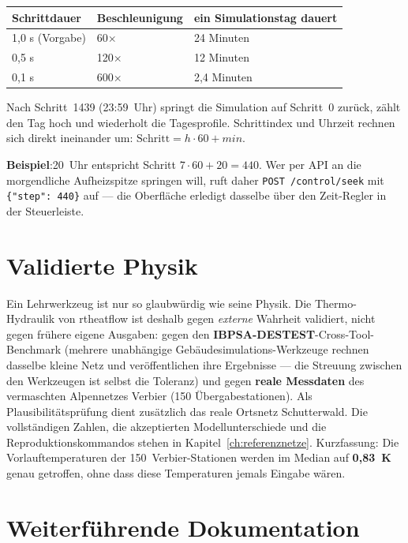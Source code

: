 \documentclass[11pt,a4paper,parskip=half]{scrreprt}
\newcommand{\api}[1]{\texttt{#1}}
\newenvironment{beispiel}[1][Beispiel]
  {\par\medskip{\color{bsp}\hrule height 0.8pt}\nopagebreak\smallskip
   \noindent\textbf{\textsf{\textcolor{bsp}{#1}}}\quad\ignorespaces}
  {\par\nopagebreak\smallskip{\color{bsp}\hrule height 0.8pt}\par\medskip}
\begin{document}
\begin{center}
\begin{tabular}{@{}lll@{}}
\toprule
Schrittdauer & Beschleunigung & ein Simulationstag dauert \\
\midrule
1{,}0 s (Vorgabe) & 60$\times$ & 24 Minuten \\
0{,}5 s & 120$\times$ & 12 Minuten \\
0{,}1 s & 600$\times$ & 2{,}4 Minuten \\
\bottomrule
\end{tabular}
\end{center}

Nach Schritt~1439 (23:59~Uhr) springt die Simulation auf Schritt~0 zurück,
zählt den Tag hoch und wiederholt die Tagesprofile. Schrittindex und Uhrzeit
rechnen sich direkt ineinander um: $\text{Schritt} = h \cdot 60 + \mathit{min}$.

\begin{beispiel}
07:20~Uhr entspricht Schritt $7 \cdot 60 + 20 = 440$. Wer per API an die
morgendliche Aufheizspitze springen will, ruft daher
\api{POST /control/seek} mit \texttt{\{"step": 440\}} auf --- die Oberfläche
erledigt dasselbe über den Zeit-Regler in der Steuerleiste.
\end{beispiel}

\section{Validierte Physik}
\label{sec:validierung}

Ein Lehrwerkzeug ist nur so glaubwürdig wie seine Physik. Die Thermo-Hydraulik
von rtheatflow ist deshalb gegen \emph{externe} Wahrheit validiert, nicht gegen
frühere eigene Ausgaben: gegen den \textbf{IBPSA-DESTEST}-Cross-Tool-Benchmark
(mehrere unabhängige Gebäudesimulations-Werkzeuge rechnen dasselbe kleine Netz
und veröffentlichen ihre Ergebnisse --- die Streuung zwischen den Werkzeugen ist
selbst die Toleranz) und gegen \textbf{reale Messdaten} des vermaschten
Alpennetzes Verbier (150 Übergabestationen). Als Plausibilitätsprüfung dient
zusätzlich das reale Ortsnetz Schutterwald. Die vollständigen Zahlen, die
akzeptierten Modellunterschiede und die Reproduktionskommandos stehen in
Kapitel~\ref{ch:referenznetze}. Kurzfassung: Die Vorlauftemperaturen der
150~Verbier-Stationen werden im Median auf \textbf{0{,}83~K} genau getroffen,
ohne dass diese Temperaturen jemals Eingabe wären.

\section{Weiterführende Dokumentation}
\label{sec:weiterdoku}
\end{document}
